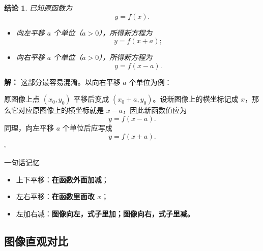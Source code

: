 \documentclass[11pt,a4paper,fontset=fandol]{ctexart}
\theoremstyle{formaltheorem}
\newtheorem{theorem}{结论}[section]
\theoremstyle{formalexample}
\newenvironment{solution}{\par\noindent\textbf{解：}}{\hfill$\square$\par}
\begin{document}
\begin{theorem}
已知原函数为
\[
y=f(x).
\]
\begin{itemize}
  \item 向左平移 $a$ 个单位（$a>0$），所得新方程为
  \[
  y=f(x+a);
  \]
  \item 向右平移 $a$ 个单位（$a>0$），所得新方程为
  \[
  y=f(x-a).
  \]
\end{itemize}
\end{theorem}

\begin{solution}
这部分最容易混淆。以向右平移 $a$ 个单位为例：

原图像上点 $(x_0,y_0)$ 平移后变成 $(x_0+a,y_0)$。设新图像上的横坐标记成 $x$，那么它对应原图像上的横坐标就是 $x-a$，因此新函数值应为
\[
y=f(x-a).
\]
同理，向左平移 $a$ 个单位后应写成
\[
y=f(x+a).
\]
\end{solution}

\begin{skillbox}{一句话记忆}
\begin{itemize}
  \item 上下平移：\textbf{在函数外面加减}；
  \item 左右平移：\textbf{在函数里面改 $x$}；
  \item 左加右减：\textbf{图像向左，式子里加；图像向右，式子里减。}
\end{itemize}
\end{skillbox}

\subsection{图像直观对比}
\end{document}
